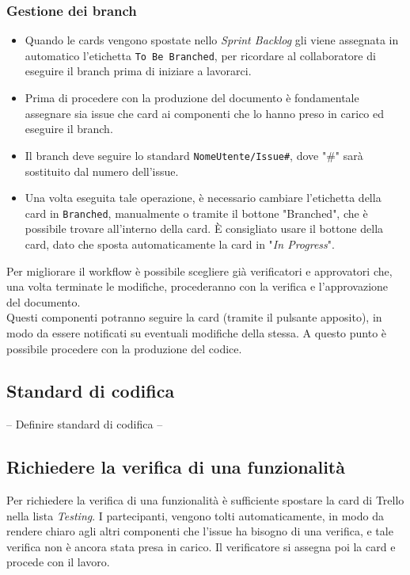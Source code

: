 \subsubsection{Gestione dei branch}
\begin{itemize}
    \item Quando le cards vengono spostate nello \textit{Sprint Backlog} gli viene assegnata in automatico l'etichetta \texttt{To Be Branched}, per ricordare al collaboratore di eseguire il branch prima di iniziare a lavorarci.
    \item Prima di procedere con la produzione del documento è fondamentale assegnare sia issue che card ai componenti che lo hanno preso in carico ed eseguire il branch.
    \item Il branch deve seguire lo standard \texttt{NomeUtente/Issue\#}, dove "\#" sarà sostituito dal numero dell'issue.
    \item Una volta eseguita tale operazione, è necessario cambiare l'etichetta della card in \texttt{Branched}, manualmente o tramite il bottone "Branched", che è possibile trovare all'interno della card. È consigliato usare il bottone della card, dato che sposta automaticamente la card in "\textit{In Progress}".
\end{itemize}
Per migliorare il workflow è possibile scegliere già verificatori e approvatori che, una volta terminate le modifiche, procederanno con la verifica e l'approvazione del documento.\\ 
Questi componenti potranno seguire la card (tramite il pulsante apposito), in modo da essere notificati su eventuali modifiche della stessa.
A questo punto è possibile procedere con la produzione del codice.
\subsection{Standard di codifica}
-- Definire standard di codifica --\\

\subsection{Richiedere la verifica di una funzionalità}
Per richiedere la verifica di una funzionalità è sufficiente spostare la card di Trello nella lista \textit{Testing}. I partecipanti, vengono tolti automaticamente, in modo da rendere chiaro agli altri componenti che l'issue ha bisogno di una verifica, e tale verifica non è ancora stata presa in carico. Il verificatore si assegna poi la card e procede con il lavoro.


